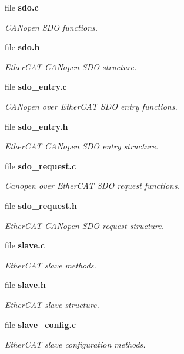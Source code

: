 \begin{DoxyCompactItemize}
file {\bf sdo.\-c}
\begin{DoxyCompactList}\small\item\em C\-A\-Nopen S\-D\-O functions. \end{DoxyCompactList}\item 
file {\bf sdo.\-h}
\begin{DoxyCompactList}\small\item\em Ether\-C\-A\-T C\-A\-Nopen S\-D\-O structure. \end{DoxyCompactList}\item 
file {\bf sdo\-\_\-entry.\-c}
\begin{DoxyCompactList}\small\item\em C\-A\-Nopen over Ether\-C\-A\-T S\-D\-O entry functions. \end{DoxyCompactList}\item 
file {\bf sdo\-\_\-entry.\-h}
\begin{DoxyCompactList}\small\item\em Ether\-C\-A\-T C\-A\-Nopen S\-D\-O entry structure. \end{DoxyCompactList}\item 
file {\bf sdo\-\_\-request.\-c}
\begin{DoxyCompactList}\small\item\em Canopen over Ether\-C\-A\-T S\-D\-O request functions. \end{DoxyCompactList}\item 
file {\bf sdo\-\_\-request.\-h}
\begin{DoxyCompactList}\small\item\em Ether\-C\-A\-T C\-A\-Nopen S\-D\-O request structure. \end{DoxyCompactList}\item 
file {\bf slave.\-c}
\begin{DoxyCompactList}\small\item\em Ether\-C\-A\-T slave methods. \end{DoxyCompactList}\item 
file {\bf slave.\-h}
\begin{DoxyCompactList}\small\item\em Ether\-C\-A\-T slave structure. \end{DoxyCompactList}\item 
file {\bf slave\-\_\-config.\-c}
\begin{DoxyCompactList}\small\item\em Ether\-C\-A\-T slave configuration methods. \end{DoxyCompactList}\item 

\end{DoxyCompactItemize}

